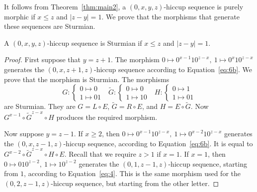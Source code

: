 \documentclass[12pt,reqno]{article}
\begin{document}
It follows from Theorem~\ref{thm:main2}, a $(0,x,y,z)$-hiccup sequence is purely
morphic if $x\leq z$ and $|z-y|=1$. We prove that the morphisms that generate
these sequences are Sturmian.

\begin{lemma}
    A $(0,x,y,z)$-hiccup sequence is Sturmian if $x\leq z$ and $|z-y|=1$.
\end{lemma}
\begin{proof}
    First suppose that $y=z+1$.
    The morphism $0\mapsto 0^{x-1}10^{z-x},\ 1\mapsto 0^{x}10^{z-x}$ 
    generates the $(0,x,z+1,z)$-hiccup sequence according to
    Equation~\ref{eq:6b}. We prove that the morphism is Sturmian. 
    The morphisms
    \[
  G\colon  \begin{cases}
0 \mapsto 0 \\
1 \mapsto 01
\end{cases}
\text{ }
\tilde  G\colon  \begin{cases}
0 \mapsto 0 \\
1 \mapsto 10
\end{cases}
\text{ }
H\colon
\begin{cases}
0 \mapsto 1 \\
1 \mapsto 01
\end{cases}
    \]
    are Sturmian. They are $G=L\circ E$, $\tilde G=R\circ E$,
    and $H=E\circ \tilde G$.
    Now $G^{x-1}\circ \tilde G^{z-x}\circ H$ produces the required morphism.    

    Now suppose $y=z-1$. If $x\geq 2$, then 
    $0\mapsto 0^{x-1}10^{z-x},\ 1\mapsto 0^{x-2}10^{z-x}$ 
    generates the $(0,x,z-1,z)$-hiccup sequence, according to
    Equation~\ref{eq:6b}. It is equal to
    $G^{x-2}\circ \tilde G^{z-x}\circ H\circ E$.
    Recall that we require $z>1$ if $x=1$. If $x=1$, then
    $0\mapsto 010^{z-2},\ 1\mapsto 10^{z-2}$ generates the
    $(0,1,z-1,z)$-hiccup sequence, starting from $1$, according
    to Equation~\ref{eq:4}. 
    This is the same morphism used for the
    $(0,2,z-1,z)$-hiccup sequence, but starting from
    the other letter.
\end{proof}
\end{document}
